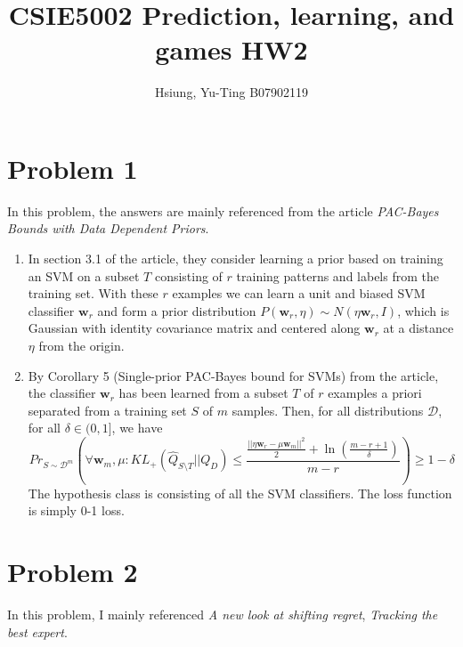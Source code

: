 \documentclass[a4paper, 12pt]{article}
\title{CSIE5002 Prediction, learning, and games HW2}
\author{Hsiung, Yu-Ting B07902119}
\begin{document}
\maketitle

\section*{Problem 1}

In this problem, the answers are mainly referenced from the article \textit{PAC-Bayes Bounds with Data Dependent Priors}\cite{parrado2012pac}.

\begin{enumerate}
  \item In section 3.1 of the article, they consider learning a prior based on training an SVM on a subset $T$ consisting of $r$ training patterns and labels from the training set. With these $r$ examples we can learn a unit and biased SVM classifier $\mathbf{w}_r$ and form a prior distribution $P(\mathbf{w}_r, \eta) \sim N(\eta \mathbf{w}_r, I)$, which is Gaussian with identity covariance matrix and centered along $\mathbf{w}_r$ at a distance $\eta$ from the origin.

  \item By Corollary 5 (Single-prior PAC-Bayes bound for SVMs) from the article, the classifier $\mathbf{w}_r$ has been learned from a subset $T$ of $r$ examples a priori separated from a training set $S$ of $m$ samples. Then, for all distributions $\mathcal{D}$, for
        all $\delta \in (0,1]$, we have
        \[Pr_{S \sim \mathcal{D}^m} \left( \forall \mathbf{w}_m, \mu: KL_+(\hat{Q}_{S\setminus T }|| Q_D) \leq \frac{\frac{||\eta \mathbf{w}_r - \mu \mathbf{w}_m||^2}{2}+\ln(\frac{m-r+1}{\delta})}{m-r}\right) \geq 1 - \delta\]
        The hypothesis class is consisting of all the SVM classifiers. The loss function is simply 0-1 loss.
\end{enumerate}

\section*{Problem 2}
In this problem, I mainly referenced \textit{A new look at shifting regret}\cite{cesa2012new}, \textit{Tracking the best expert}\cite{herbster1998tracking}.
\end{document}
